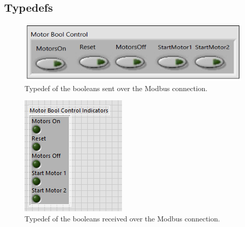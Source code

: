 \subsection{Typedefs}
\begin{multicols}{2}
\begin{figure}[H]
    \centering
    \includegraphics[width=0.5\linewidth]{vis/Motor Bool control.PNG}
    \caption{Typedef of the booleans sent over the Modbus connection.}
    \label{fig:MotorBoolCl}
\end{figure}
\begin{figure}[H]
    \centering
    \includegraphics[width=0.5\linewidth]{vis/Motor Bool Indicatorsl.PNG}
    \caption{Typedef of the booleans received over the Modbus connection.}
    \label{fig:MotorBoolInd}
\end{figure}
\begin{figure}[H]
    \centering

\end{figure}
\end{multicols}
